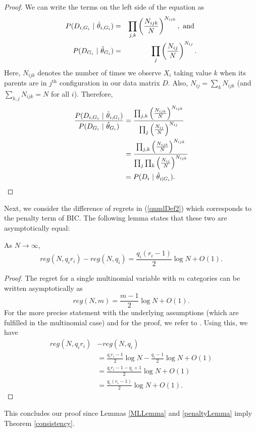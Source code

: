 \begin{proof}
We can write the terms on the left side of the equation as
\begin{eqnarray*}
P(D_{i, G_i} \ | \ \hat{\theta}_{i, G_i}) &=& \prod_{j,k} \left( \frac{N_{ijk}}{N}  \right)^{N_{ijk}}, \text{ and }\\
P(D_{G_i} \ | \ \hat{\theta}_{G_i} ) &=&  \prod_{j} \left( \frac{N_{ij}}{N}  \right)^{N_{ij}}.
\end{eqnarray*}
Here, $N_{ijk}$ denotes the number of times we observe $X_i$ taking value $k$ when its parents are in $j^\text{th}$ configuration in our data matrix $D$. Also, $N_{ij} = \sum_k N_{ijk}$ (and $\sum_{k,j}N_{ijk} = N$ for all $i$).
Therefore,
\begin{align*}
\frac{P(D_{i, G_i} \ | \ \hat{\theta}_{i, G_i} )}{P(D_{G_i} \ | \ \hat{\theta}_{G_i} )} &= \frac{ \prod_{j,k} \left( \frac{N_{ijk}}{N}  \right)^{N_{ijk}}}{\prod_{j} \left( \frac{N_{ij}}{N}  \right)^{N_{ij}}} \\
&= \frac{ \prod_{j,k} \left( \frac{N_{ijk}}{N}  \right)^{N_{ijk}}}{\prod_{j}\prod_{k} \left( \frac{N_{ij}}{N}  \right)^{N_{ijk}}}\\
&= P(D_i \ | \ \hat{\theta}_{i | G_i} ).
\end{align*} 

\end{proof}
Next, we consider the difference of regrets in
(\ref{qnmlDef2}) which corresponds to the penalty term of BIC. The
following lemma states that these two are asymptotically equal:

\begin{lemma}\label{penaltyLemma}
As $N \to \infty$,
$$reg(N,q_i r_i) - reg(N,q_i) = \frac{q_i(r_i - 1)}{2}\log N + O(1).$$   
\end{lemma}
\begin{proof}
The regret
for a single multinomial variable with $m$ categories can be written
asymptotically as
\begin{equation}\label{regretAsymp}
reg(N,m) = \frac{m-1}{2}\log N + O(1).
\end{equation}
For the more precise statement with the underlying assumptions (which are fulfilled in the multinomial case) and for the proof, we refer to \cite{Riss96a, Grun07}. Using this, we have
\begin{align*}
reg(N,q_i r_i)& -  reg(N,q_i) \\ 
&= \frac{q_ir_i-1}{2}\log N-\frac{q_i-1}{2}\log N + O(1) \\
&= \frac{q_ir_i-1-q_i + 1}{2}\log N + O(1) \\
&= \frac{q_i(r_i - 1)}{2} \log N + O(1).
\end{align*}
\end{proof}
This concludes our proof since Lemmas \ref{MLLemma} and
\ref{penaltyLemma} imply Theorem \ref{consistency}.


